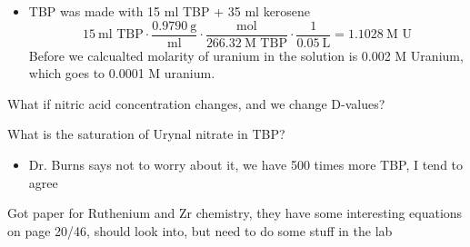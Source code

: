 \documentclass[idxtotoc,hyperref,openany,oneside]{labbook} %
\begin{document}
\begin{todolist}
\begin{todolist}
\begin{itemize}
    \item{TBP was made with 15 ml TBP + 35 ml kerosene}
      \begin{equation*}
        15\ \text{ml TBP}\cdot\frac{0.9790\ \text{g}}{\text{ml}}
        \cdot\frac{\text{mol}}{266.32\ \text{M TBP}}\cdot
        \frac{1}{0.05\ \text{L}}=1.1028\ \text{M U}
      \end{equation*}
      Before we calcualted molarity of uranium in the solution is
      0.002 M Uranium, which goes to 0.0001 M uranium.
    \end{itemize}
  \end{todolist}
\item{What if nitric acid concentration changes, and we change D-values?}
\item{What is the saturation of Urynal nitrate in TBP?}
  \begin{itemize}
  \item{Dr. Burns says not to worry about it, we have 500 times more
    TBP, I tend to agree}
  \end{itemize}
\item{Got paper for Ruthenium and Zr chemistry, they have
  some interesting equations on page 20/46, should look into,
  but need to do some stuff in the lab}
\end{todolist}

\end{document}
